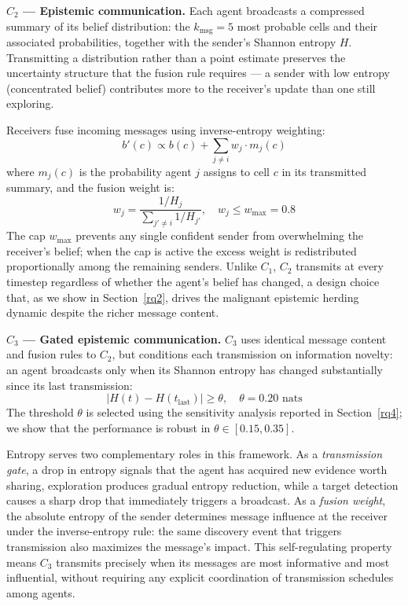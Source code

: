 \documentclass[pdflatex,sn-mathphys-num]{sn-jnl}%
\theoremstyle{thmstyleone}%
\theoremstyle{thmstyletwo}%
\theoremstyle{thmstylethree}%
\begin{document}
\textbf{$C_2$ --- Epistemic communication.} Each agent broadcasts a 
compressed summary of its belief distribution: the $k_{\text{msg}} = 5$ 
most probable cells and their associated probabilities, together with 
the sender's Shannon entropy $H$. Transmitting a distribution rather 
than a point estimate preserves the uncertainty structure that the 
fusion rule requires --- a sender with low entropy (concentrated belief) 
contributes more to the receiver's update than one still exploring.

Receivers fuse incoming messages using inverse-entropy weighting:
\begin{equation}
    b'(c) \propto b(c) + \sum_{j \neq i} w_j \cdot m_j(c)
\end{equation}
where $m_j(c)$ is the probability agent $j$ assigns to cell $c$ in its 
transmitted summary, and the fusion weight is:
\begin{equation}
    w_j = \frac{1/H_j}{\sum_{j' \neq i} 1/H_{j'}}, \quad w_j \leq w_{\max} = 0.8
\end{equation}
The cap $w_{\max}$ prevents any single confident sender from 
overwhelming the receiver's belief; when the cap is active the excess weight is redistributed proportionally among the remaining senders. Unlike $C_1$, $C_2$ transmits at every timestep regardless of whether the agent's belief has changed, a design choice that, as we show in Section~\ref{rq2}, drives the malignant epistemic herding dynamic despite the richer message content.

\textbf{$C_3$ --- Gated epistemic communication.} $C_3$ uses identical message content and fusion rules to $C_2$, but conditions each transmission on information novelty: an agent broadcasts only when its Shannon entropy has changed substantially since its last transmission:
\begin{equation}
    |H(t) - H(t_{\text{last}})| \geq \theta, \quad \theta = 0.20 \text{ nats}
\end{equation}
The threshold $\theta$ is selected using the sensitivity analysis reported in Section~\ref{rq4}; we show that the performance is robust in $\theta \in [0.15, 0.35]$.

Entropy serves two complementary roles in this framework. As a 
\textit{transmission gate}, a drop in entropy signals that the agent has acquired new evidence worth sharing, exploration produces gradual entropy reduction, while a target detection causes a sharp drop that immediately triggers a broadcast. As a \textit{fusion weight}, the absolute entropy of the sender determines message influence at the receiver under the inverse-entropy rule: the same discovery event that triggers transmission also maximizes the message's impact. This self-regulating property means $C_3$ transmits precisely when its messages are most informative and most influential, without requiring any explicit coordination of transmission schedules among agents.
\end{document}
